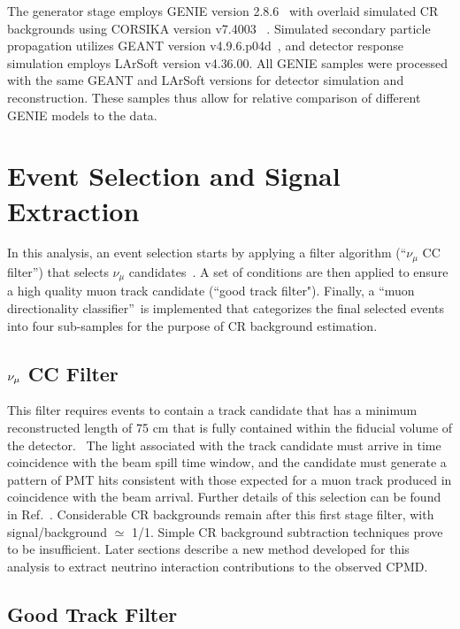 \documentclass{article}
\begin{document}
The generator stage employs GENIE version 2.8.6~\cite{GENIE reference} with
overlaid simulated CR backgrounds using CORSIKA version v7.4003~\cite{Corsika}%
. Simulated secondary particle propagation utilizes GEANT version v4.9.6.p04d~\cite{Geant4 reference}, and detector response simulation employs LArSoft
version v4.36.00. All GENIE samples were processed with the same GEANT and
LArSoft versions for detector simulation and reconstruction. These samples
thus allow for relative comparison of different GENIE models to the data.

\section{Event Selection and Signal Extraction}

In this analysis, an event selection starts by applying a filter algorithm
(\textquotedblleft $\nu _{\mu }$ CC filter\textquotedblright ) that selects 
\emph{$\nu _{\mu }$ }candidates~\cite{DocDB5982-CC-XC-PUB}. A set of
conditions are then applied to ensure a high quality muon track candidate
(\textquotedblleft good track filter"). Finally, a \textquotedblleft muon
directionality classifier\textquotedblright\ is implemented that categorizes
the final selected events into four sub-samples for the purpose of CR
background estimation.

\subsection{$\protect\nu _{\protect\mu }$ CC Filter}

This filter requires events to contain a track candidate that has a minimum
reconstructed length of 75 cm that is fully contained within the fiducial
volume of the detector. \ The light associated with the track candidate must arrive in time coincidence with the beam spill time window, and the candidate must generate a pattern of PMT hits consistent with those expected for a muon track produced in coincidence
with the beam arrival. Further details of this selection can be found
in Ref.~\cite{DocDB5982-CC-XC-PUB}. Considerable CR backgrounds remain after this first stage filter, with signal/background $\simeq $ 1/1.  Simple CR background subtraction techniques prove to be insufficient. Later sections describe a new method developed for this analysis to extract neutrino interaction contributions to the observed CPMD.

\subsection{Good Track Filter}
\end{document}
